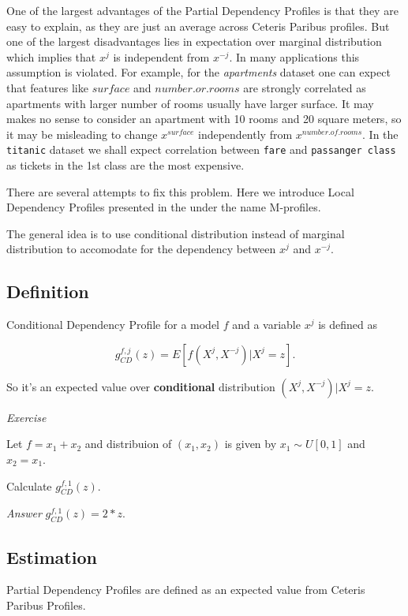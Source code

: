 \documentclass[12pt,]{krantz}
\theoremstyle{definition}
\theoremstyle{definition}
\theoremstyle{definition}
\theoremstyle{remark}
\begin{document}
One of the largest advantages of the Partial Dependency Profiles is that
they are easy to explain, as they are just an average across Ceteris
Paribus profiles. But one of the largest disadvantages lies in
expectation over marginal distribution which implies that \(x^j\) is
independent from \(x^{-j}\). In many applications this assumption is
violated. For example, for the \emph{apartments} dataset one can expect
that features like \(surface\) and \(number.or.rooms\) are strongly
correlated as apartments with larger number of rooms usually have larger
surface. It may makes no sense to consider an apartment with 10 rooms
and 20 square meters, so it may be misleading to change \(x^{surface}\)
independently from \(x^{number.of.rooms}\). In the \texttt{titanic}
dataset we shall expect correlation between \texttt{fare} and
\texttt{passanger\ class} as tickets in the 1st class are the most
expensive.

There are several attempts to fix this problem. Here we introduce Local
Dependency Profiles presented in the \citep{R-ALEPlot} under the name
M-profiles.

The general idea is to use conditional distribution instead of marginal
distribution to accomodate for the dependency between \(x^j\) and
\(x^{-j}\).

\hypertarget{definition-1}{%
\subsection{Definition}\label{definition-1}}

Conditional Dependency Profile for a model \(f\) and a variable \(x^j\)
is defined as

\[
g_{CD}^{f, j}(z) = E[f(X^j, X^{-j})|X^j = z].
\]

So it's an expected value over \textbf{conditional} distribution
\((X^j,X^{-j})|X^j=z\).

\emph{Exercise}

Let \(f = x_1 + x_2\) and distribuion of \((x_1, x_2)\) is given by
\(x_1 \sim U[0,1]\) and \(x_2=x_1\).

Calculate \(g_{CD}^{f, 1}(z)\).

\emph{Answer} \(g_{CD}^{f, 1}(z) = 2*z\).

\hypertarget{estimation-1}{%
\subsection{Estimation}\label{estimation-1}}

Partial Dependency Profiles are defined as an expected value from
Ceteris Paribus Profiles.
\end{document}
